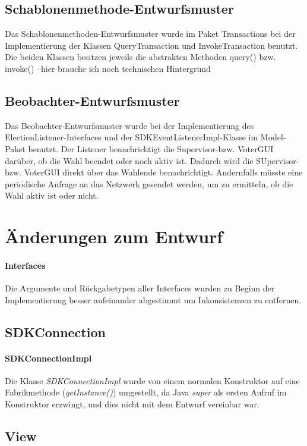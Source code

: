 \documentclass[parskip=full]{scrartcl}
\begin{document}
\subsection{Schablonenmethode-Entwurfsmuster}
Das Schablonenmethoden-Entwurfsmuster wurde im Paket Transactions bei der Implementierung der Klassen QueryTransaction und InvokeTransaction benutzt.
Die beiden Klassen besitzen jeweils die abstrakten Methoden query() bzw. invoke() --hier brauche ich noch technischen Hintergrund

\subsection{Beobachter-Entwurfsmuster}
Das Beobachter-Entwurfsmuster wurde bei der Implementierung des ElectionListener-Interfaces und der SDKEventListenerImpl-Klasse im Model-Paket benutzt. Der Listener benachrichtigt die Supervisor-bzw. VoterGUI darüber, ob die Wahl beendet oder noch aktiv ist. Dadurch wird die SUpervisor- bzw. VoterGUI direkt über das Wahlende benachrichtigt. Andernfalls müsste eine periodische Anfrage an das Netzwerk gesendet werden, um zu ermitteln, ob die Wahl aktiv ist oder nicht.

\section{Änderungen zum Entwurf}
\paragraph{Interfaces}
Die Argumente und Rückgabetypen aller Interfaces wurden zu Beginn der Implementierung besser aufeinander abgestimmt um Inkonsistenzen zu entfernen.

\subsection{SDKConnection}

\paragraph{SDKConnectionImpl}
Die Klasse \textit{SDKConnectionImpl} wurde von einem normalen Konstruktor auf eine Fabrikmethode (\textit{getInstance()}) umgestellt, da Java \textit{super} als ersten Aufruf im Konstruktor erzwingt, und dies nicht mit dem Entwurf vereinbar war.

\subsection{View}
\end{document}

